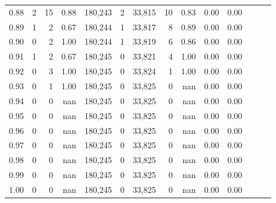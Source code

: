\begin{tabular}{rrrrrrrrrrrrrr}
0.88 &       2 &     15 &  0.88 &  180,243 &        2 &  33,815 &      10 &  0.83 &  0.00 &      0.00 \\
0.89 &       1 &      2 &  0.67 &  180,244 &        1 &  33,817 &       8 &  0.89 &  0.00 &      0.00 \\
0.90 &       0 &      2 &  1.00 &  180,244 &        1 &  33,819 &       6 &  0.86 &  0.00 &      0.00 \\
0.91 &       1 &      2 &  0.67 &  180,245 &        0 &  33,821 &       4 &  1.00 &  0.00 &      0.00 \\
0.92 &       0 &      3 &  1.00 &  180,245 &        0 &  33,824 &       1 &  1.00 &  0.00 &      0.00 \\
0.93 &       0 &      1 &  1.00 &  180,245 &        0 &  33,825 &       0 &   nan &  0.00 &      0.00 \\
0.94 &       0 &      0 &   nan &  180,245 &        0 &  33,825 &       0 &   nan &  0.00 &      0.00 \\
0.95 &       0 &      0 &   nan &  180,245 &        0 &  33,825 &       0 &   nan &  0.00 &      0.00 \\
0.96 &       0 &      0 &   nan &  180,245 &        0 &  33,825 &       0 &   nan &  0.00 &      0.00 \\
0.97 &       0 &      0 &   nan &  180,245 &        0 &  33,825 &       0 &   nan &  0.00 &      0.00 \\
0.98 &       0 &      0 &   nan &  180,245 &        0 &  33,825 &       0 &   nan &  0.00 &      0.00 \\
0.99 &       0 &      0 &   nan &  180,245 &        0 &  33,825 &       0 &   nan &  0.00 &      0.00 \\
1.00 &       0 &      0 &   nan &  180,245 &        0 &  33,825 &       0 &   nan &  0.00 &      0.00 \\
\bottomrule
\end{tabular}
